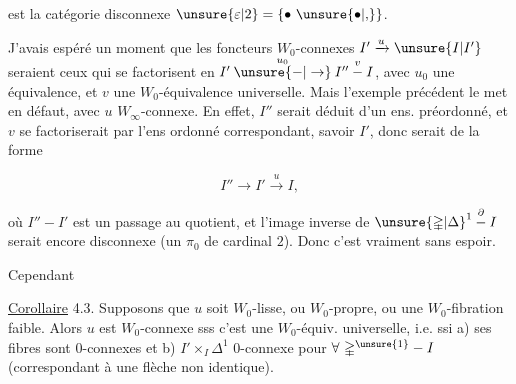 est la catégorie disconnexe $\unsure{\varepsilon|2}=\{\bullet\ \unsure{\bullet|{,}}\}$.

J'avais espéré un moment que les foncteurs $W_0$-connexes $I'\xrightarrow{u}\unsure{I|I'}$ seraient ceux qui se factorisent en $I'\overset{u_0}{\mathbin{\unsure{-|\to}}}I''\overset{v}{\mathbin{-}}I$, avec  $u_0$ une équivalence, et $v$ une $W_0$-équivalence universelle. Mais l'exemple précédent le met en défaut, avec $u$   $W_\infty$-connexe. En effet, $I''$ serait  déduit d'un ens. préordonné, et $v$ se factoriserait par l'ens ordonné correspondant, savoir $I'$, donc serait de la forme

\[
 I''\longrightarrow I'\xrightarrow{u}I,
\]

où $I''\mathbin{-}I'$ est un passage au quotient, et l'image inverse de $\unsure{\mathbb{\Delta}|\Delta}^1\overset{\partial}{\mathbin{-}}I$ serait encore disconnexe (un $\pi_0$ de cardinal $2$). Donc c'est vraiment sans espoir.

Cependant

\uline{Corollaire} 4.3. Supposons que $u$ soit $W_0$-lisse, ou $W_0$-propre, ou une $W_0$-fibration faible. Alors $u$ est $W_0$-connexe sss c'est une $W_0$-équiv. universelle, i.e. ssi a) ses fibres sont $0$-connexes et b) $I'\times_I\mathbb{\Delta}^1$ $0$-connexe pour $\forall\ \mathbb{\Delta}^{\unsure{1}}\mathbin{-}I$ (correspondant à une flèche non identique).
